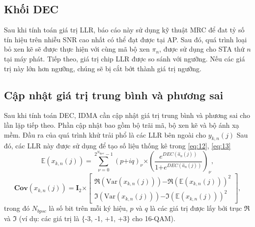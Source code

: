 \subsection{Khối DEC}

Sau khi tính toán giá trị LLR, báo cáo này sử dụng kỹ thuật \acrshort{MRC} để đat tỷ số tín hiệu trên nhiễu \acrshort{SNR} cao nhất có thể đạt được tại AP. Sau đó, quá trình loại bỏ xen kẽ sẽ được thực hiện với cùng mã bộ xen $\pi_n$, được sử dụng cho STA thứ $n$ tại máy phát. Tiếp theo, giá trị chip LLR được so sánh với ngưỡng. Nếu các giá trị này lớn hơn ngưỡng, chúng sẽ bị cắt bớt thành giá trị ngưỡng.

\subsection{Cập nhật giá trị trung bình và phương sai} \label{update}
Sau khi tính toán DEC, IDMA cần cập nhật giá trị trung bình và phương sai cho lần lặp tiếp theo. Phần cập nhật bao gồm bộ trãi mã, bộ xen kẽ và bộ ánh xạ mềm. Đầu ra của quá trình khử trải phổ là các LLR bên ngoài cho $y_{k,n}(j)$ Sau đó, các LLR này được sử dụng để tạo số liệu thống kê trong \eqref{eq:12}, \eqref{eq:13}
\begin{equation}
    \mathbb{E}(x_{k,n}(j)) = \sum_{\nu = 0}^{2^{N_{bpsc}}-1} (p \mathord{+}iq)_\nu \mathord{\times} \left(\dfrac{e^{DEC(\hat{a}_n(j))}}{1 \mathord{+} e^{DEC(\hat{a}_n(j))}}\right)_\nu,
    \label{eq:12}
\end{equation}
\begin{equation}
        \textbf{Cov}(x_{k,n}(j))
        =\textbf{I}_2 \mathord{\times}         
        \begin{bmatrix}
            \Re(\text{Var}(x_{k,n}(j))) \mathord{-} \Re(\mathbb{E}(x_{k,n}(j)))^2 \\
            \Im(\text{Var}(x_{k,n}(j))) \mathord{-} \Im(\mathbb{E}(x_{k,n}(j)))^2
        \end{bmatrix},
    \label{eq:13}
\end{equation}
trong đó $N_{bpsc}$ là số bit trên mỗi ký hiệu, $p$ và $q$ là các giá trị được lấy bởi trục $\Re$ và $\Im$ (ví dụ: các giá trị là $\{$-3, -1, +1, +3$\}$ cho 16-QAM).
